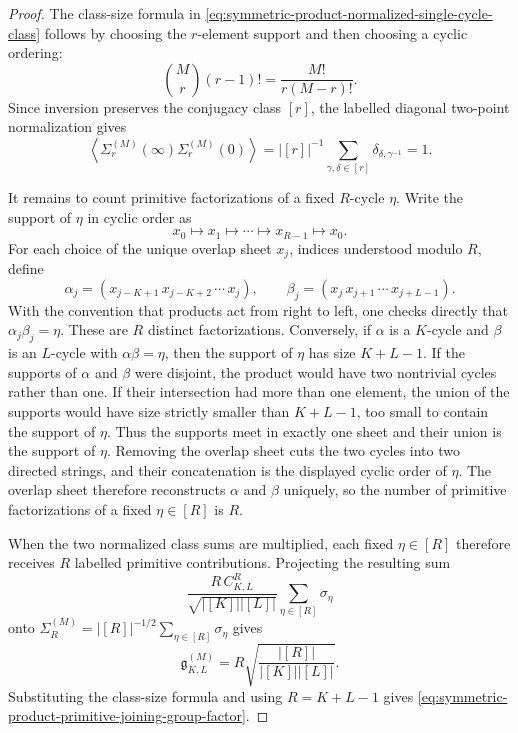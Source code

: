 \begin{proof}
The class-size formula in
\eqref{eq:symmetric-product-normalized-single-cycle-class} follows by choosing
the \(r\)-element support and then choosing a cyclic ordering:
\[
  \binom Mr(r-1)!
  =
  \frac{M!}{r(M-r)!}.
\]
Since inversion preserves the conjugacy class \([r]\), the labelled diagonal
two-point normalization gives
\[
  \left\langle
    \Sigma_r^{(M)}(\infty)\Sigma_r^{(M)}(0)
  \right\rangle
  =
  |[r]|^{-1}
  \sum_{\gamma,\delta\in[r]}\delta_{\delta,\gamma^{-1}}
  =
  1 .
\]

It remains to count primitive factorizations of a fixed \(R\)-cycle
\(\eta\).  Write the support of \(\eta\) in cyclic order as
\[
  x_0\longmapsto x_1\longmapsto\cdots
  \longmapsto x_{R-1}\longmapsto x_0 .
\]
For each choice of the unique overlap sheet \(x_j\), indices understood
modulo \(R\), define
\[
  \alpha_j
  =
  (x_{j-K+1}\,x_{j-K+2}\,\cdots\,x_j),
  \qquad
  \beta_j
  =
  (x_j\,x_{j+1}\,\cdots\,x_{j+L-1}).
\]
With the convention that products act from right to left, one checks directly
that \(\alpha_j\beta_j=\eta\).  These are \(R\) distinct factorizations.
Conversely, if \(\alpha\) is a \(K\)-cycle and \(\beta\) is an \(L\)-cycle with
\(\alpha\beta=\eta\), then the support of \(\eta\) has size \(K+L-1\).  If
the supports of \(\alpha\) and \(\beta\) were disjoint, the product would have
two nontrivial cycles rather than one.  If their intersection had more than
one element, the union of the supports would have size strictly smaller than
\(K+L-1\), too small to contain the support of \(\eta\).  Thus the supports
meet in exactly one sheet and their union is the support of \(\eta\).
Removing the overlap sheet cuts the two cycles into two directed strings, and
their concatenation is the displayed cyclic order of \(\eta\).  The overlap
sheet therefore reconstructs \(\alpha\) and \(\beta\) uniquely, so the number
of primitive factorizations of a fixed \(\eta\in[R]\) is \(R\).

When the two normalized class sums are multiplied, each fixed
\(\eta\in[R]\) therefore receives \(R\) labelled primitive contributions.
Projecting the resulting sum
\[
  \frac{R\,C_{K,L}^{R}}{\sqrt{|[K]||[L]|}}
  \sum_{\eta\in[R]}\sigma_\eta
\]
onto \(\Sigma_R^{(M)}=|[R]|^{-1/2}\sum_{\eta\in[R]}\sigma_\eta\) gives
\[
  \mathfrak g_{K,L}^{(M)}
  =
  R\sqrt{\frac{|[R]|}{|[K]||[L]|}}.
\]
Substituting the class-size formula and using \(R=K+L-1\) gives
\eqref{eq:symmetric-product-primitive-joining-group-factor}.
\end{proof}

